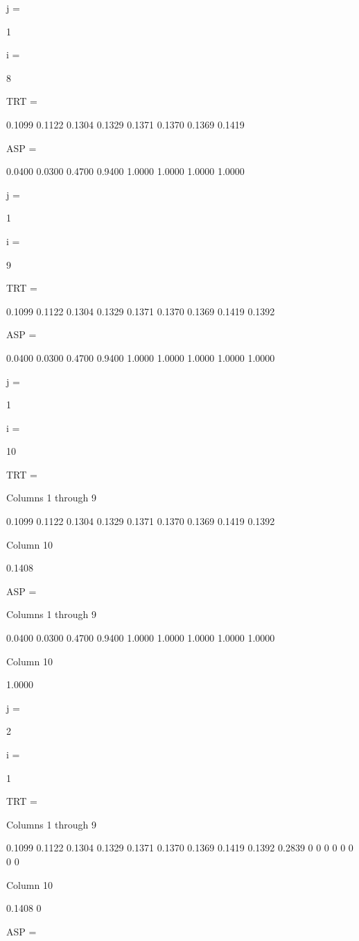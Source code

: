 j =

     1


i =

     8


TRT =

    0.1099    0.1122    0.1304    0.1329    0.1371    0.1370    0.1369    0.1419


ASP =

    0.0400    0.0300    0.4700    0.9400    1.0000    1.0000    1.0000    1.0000


j =

     1


i =

     9


TRT =

    0.1099    0.1122    0.1304    0.1329    0.1371    0.1370    0.1369    0.1419    0.1392


ASP =

    0.0400    0.0300    0.4700    0.9400    1.0000    1.0000    1.0000    1.0000    1.0000


j =

     1


i =

    10


TRT =

  Columns 1 through 9

    0.1099    0.1122    0.1304    0.1329    0.1371    0.1370    0.1369    0.1419    0.1392

  Column 10

    0.1408


ASP =

  Columns 1 through 9

    0.0400    0.0300    0.4700    0.9400    1.0000    1.0000    1.0000    1.0000    1.0000

  Column 10

    1.0000


j =

     2


i =

     1


TRT =

  Columns 1 through 9

    0.1099    0.1122    0.1304    0.1329    0.1371    0.1370    0.1369    0.1419    0.1392
    0.2839         0         0         0         0         0         0         0         0

  Column 10

    0.1408
         0


ASP =

